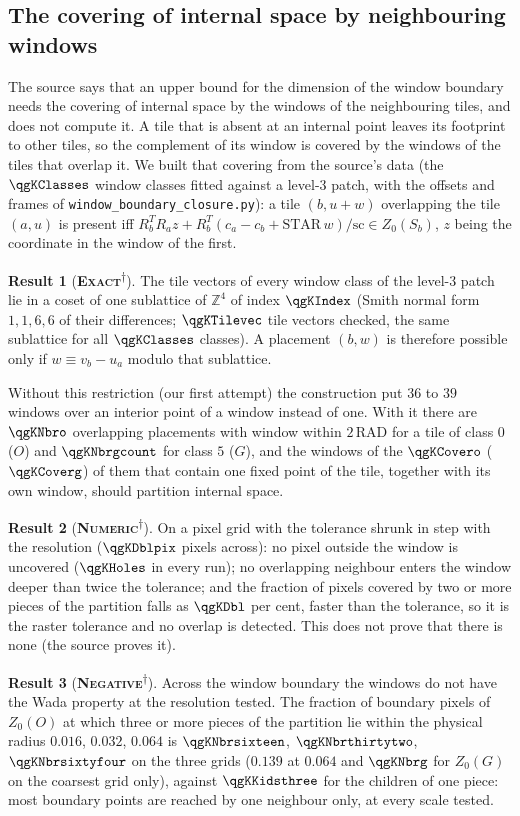 \documentclass[11pt]{article}
\newcommand{\exact}{\textbf{\textsc{Exact}}}
\newcommand{\numeric}{\textbf{\textsc{Numeric}}}
\newcommand{\negres}{\textbf{\textsc{Negative}}}
\newcommand{\snap}{\textsuperscript{$\dagger$}}      %
\theoremstyle{definition}
\newtheorem{result}{Result}
\begin{document}
\subsection{The covering of internal space by neighbouring windows}\label{sec:wada-cover}
The source says that an upper bound for the dimension of the window boundary needs the covering of internal space by the windows of the neighbouring tiles, and does not compute it. A tile that is absent at an internal point leaves its footprint to other tiles, so the complement of its window is covered by the windows of the tiles that overlap it. We built that covering from the source's data (the $\qgKClasses$ window classes fitted against a level-$3$ patch, with the offsets and frames of \texttt{window\_boundary\_closure.py}): a tile $(b,u+w)$ overlapping the tile $(a,u)$ is present iff $R_b^{T}R_a z+R_b^{T}(c_a-c_b+\mathrm{STAR}\,w)/\mathrm{sc}\in Z_0(S_b)$, $z$ being the coordinate in the window of the first.
\begin{result}[\exact\snap]\label{res:index36}
The tile vectors of every window class of the level-$3$ patch lie in a coset of one sublattice of $\mathbb{Z}^4$ of index $\qgKIndex$ (Smith normal form $1,1,6,6$ of their differences; $\qgKTilevec$ tile vectors checked, the same sublattice for all $\qgKClasses$ classes). A placement $(b,w)$ is therefore possible only if $w\equiv v_b-u_a$ modulo that sublattice.
\end{result}
Without this restriction (our first attempt) the construction put $36$ to $39$ windows over an interior point of a window instead of one. With it there are $\qgKNbro$ overlapping placements with window within $2\,\mathrm{RAD}$ for a tile of class $0$ ($O$) and $\qgKNbrgcount$ for class $5$ ($G$), and the windows of the $\qgKCovero$ ($\qgKCoverg$) of them that contain one fixed point of the tile, together with its own window, should partition internal space.
\begin{result}[\numeric\snap]\label{res:cover-checks}
On a pixel grid with the tolerance shrunk in step with the resolution ($\qgKDblpix$ pixels across): no pixel outside the window is uncovered ($\qgKHoles$ in every run); no overlapping neighbour enters the window deeper than twice the tolerance; and the fraction of pixels covered by two or more pieces of the partition falls as $\qgKDbl$ per cent, faster than the tolerance, so it is the raster tolerance and no overlap is detected. This does not prove that there is none (the source proves it).
\end{result}
\begin{result}[\negres\snap]\label{res:cover-wada}
Across the window boundary the windows do not have the Wada property at the resolution tested. The fraction of boundary pixels of $Z_0(O)$ at which three or more pieces of the partition lie within the physical radius $0.016$, $0.032$, $0.064$ is $\qgKNbrsixteen$, $\qgKNbrthirtytwo$, $\qgKNbrsixtyfour$ on the three grids ($0.139$ at $0.064$ and $\qgKNbrg$ for $Z_0(G)$ on the coarsest grid only), against $\qgKKidsthree$ for the children of one piece: most boundary points are reached by one neighbour only, at every scale tested.
\end{result}
\end{document}
